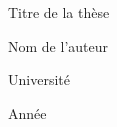 \begin{titlepage}
    \centering
    {\Huge Titre de la thèse \par}
    \vfill
    {\Large Nom de l'auteur \par}
    \vfill
    {\large Université \par}
    \vfill
    Année
\end{titlepage}

